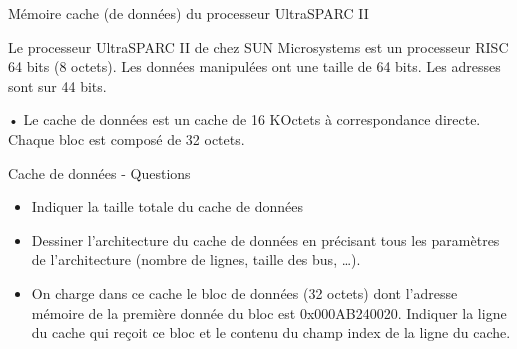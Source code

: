 %
\begin{Frame}{Mémoire cache (de données) du processeur UltraSPARC II}


      Le processeur UltraSPARC II de chez SUN Microsystems est un processeur RISC 64 bits (8 octets). Les données manipulées ont une taille de 64 bits. Les adresses sont sur 44 bits. 

•	Le cache de données est un cache de 16 KOctets à correspondance directe. Chaque bloc est composé de 32 octets.\\


      \begin{block}{Cache de données - Questions}
       \begin{center}
 	\begin{itemize}
         \item Indiquer la taille totale du cache de données
         \item Dessiner l'architecture du cache de données en précisant tous les paramètres de l'architecture (nombre de lignes, taille des bus, …).
	 \item On charge dans ce cache le bloc de données (32 octets) dont l'adresse mémoire de la première donnée du bloc est 0x000AB240020. Indiquer la ligne du cache qui reçoit ce bloc et le contenu du champ index de la ligne du cache.
        \end{itemize}
       \end{center}
      \end{block}   

 

\end{Frame}


